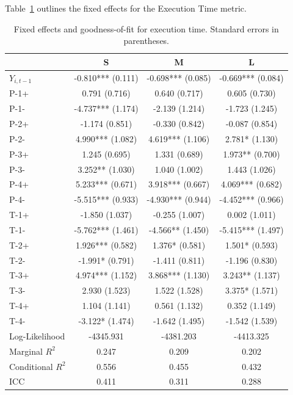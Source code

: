 Table~\ref{tab:full_execution_time} outlines the fixed effects for the Execution Time metric.

\begin{table}[hbt!]
\caption{Fixed effects and goodness-of-fit for execution time. Standard errors in parentheses.}
\label{tab:full_execution_time}
\begin{tabular}{lccc}
\toprule
 & S & M & L \\
\midrule
$Y_{i,t-1}$  & -0.810*** (0.111) & -0.698*** (0.085) & -0.669*** (0.084) \\
P-1+ & 0.791 (0.716) & 0.640 (0.717) & 0.605 (0.730) \\
P-1- & -4.737*** (1.174) & -2.139 (1.214) & -1.723 (1.245) \\
P-2+ & -1.174 (0.851) & -0.330 (0.842) & -0.087 (0.854) \\
P-2- & 4.990*** (1.082) & 4.619*** (1.106) & 2.781* (1.130) \\
P-3+ & 1.245 (0.695) & 1.331 (0.689) & 1.973** (0.700) \\
P-3- & 3.252** (1.030) & 1.040 (1.002) & 1.443 (1.026) \\
P-4+ & 5.233*** (0.671) & 3.918*** (0.667) & 4.069*** (0.682) \\
P-4- & -5.515*** (0.933) & -4.930*** (0.944) & -4.452*** (0.966) \\
T-1+ & -1.850 (1.037) & -0.255 (1.007) & 0.002 (1.011) \\
T-1- & -5.762*** (1.461) & -4.566** (1.450) & -5.415*** (1.497) \\
T-2+ & 1.926*** (0.582) & 1.376* (0.581) & 1.501* (0.593) \\
T-2- & -1.991* (0.791) & -1.411 (0.811) & -1.196 (0.830) \\
T-3+ & 4.974*** (1.152) & 3.868*** (1.130) & 3.243** (1.137) \\
T-3- & 2.930 (1.523) & 1.522 (1.528) & 3.375* (1.571) \\
T-4+ & 1.104 (1.141) & 0.561 (1.132) & 0.352 (1.149) \\
T-4- & -3.122* (1.474) & -1.642 (1.495) & -1.542 (1.539) \\
\midrule
Log-Likelihood & -4345.931 & -4381.203 & -4413.325 \\
Marginal $R^2$ & 0.247 & 0.209 & 0.202 \\
Conditional $R^2$ & 0.556 & 0.455 & 0.432 \\
ICC & 0.411 & 0.311 & 0.288 \\
\bottomrule
\end{tabular}
\end{table}
\newpage
